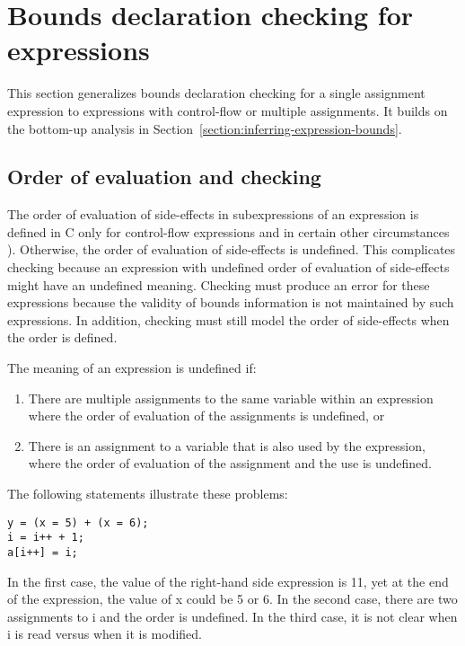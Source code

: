 \section{Bounds declaration checking for expressions}

\label{section:checking-assignment-expressions}
\label{section:checking-nested-assignment-expressions}

This section generalizes bounds declaration checking for a single
assignment expression to expressions with control-flow or multiple
assignments.
It builds on the bottom-up analysis in
Section~\ref{section:inferring-expression-bounds}.

\subsection{Order of evaluation and checking}
\label{section:avoiding-undefinedness}

The order of evaluation of side-effects in subexpressions of an expression is defined in C only for 
control-flow expressions and in certain other circumstances \cite[Section 6.5,Annex C]{ISO2011}).
Otherwise, the order of evaluation of side-effects is undefined.   This complicates checking 
because an expression with undefined order of evaluation of side-effects might have an 
undefined meaning.  Checking must produce an error for these expressions because the
validity of bounds information is not maintained by such expressions.   In addition, checking must still
model the order of side-effects when the order is defined.

The meaning of an expression is undefined if:

\begin{enumerate}
\item
  There are multiple assignments to the same variable within an
  expression where the order of evaluation of the assignments is
  undefined, or
\item
  There is an assignment to a variable that is also used by the
  expression, where the order of evaluation of the assignment and the
  use is undefined.
\end{enumerate}

The following statements illustrate these problems:

\begin{lstlisting}
y = (x = 5) + (x = 6);
i = i++ + 1;
a[i++] = i;
\end{lstlisting}

In the first case, the value of the right-hand side expression is 11,
yet at the end of the expression, the value of x could be 5 or 6. In the
second case, there are two assignments to i and the order is undefined.
In the third case, it is not clear when i is read versus when it is
modified.

